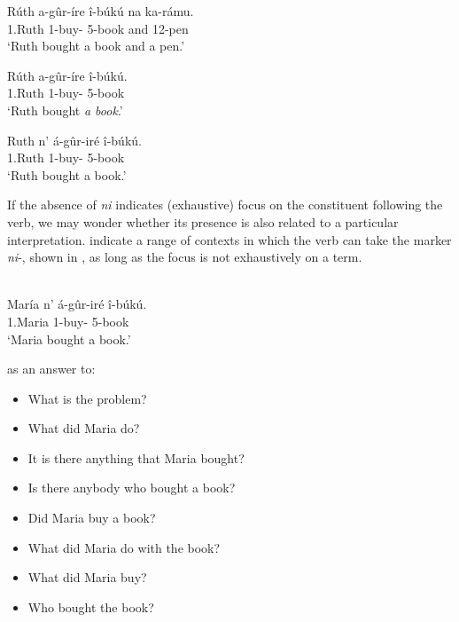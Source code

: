 \documentclass[output=paper]{langscibook}
\begin{document}
\ea
\label{bkm:Ref94536081}\citet[713, tones added]{AbelsMuriungi2008}


\ea
\gll
Rúth  a-gûr-íre  î-búkú  na  ka-rámu.\\
1.Ruth 1\SM{}-buy-\PFV{} 5-book  and  12-pen\\
\glt
‘Ruth bought a book and a pen.’

\ex
\begin{xlist}
\exi{$\not\Rightarrow$}
\label{bkm:Ref94537049}
\gll
Rúth  a-gûr-íre  î-búkú.\\
1.Ruth  1\SM{}-buy-\PFV{} 5-book\\
\glt
‘Ruth bought \textit{a book}.’
\end{xlist}

\ex
\begin{xlist}
\exi{$\Rightarrow$}
\label{bkm:Ref94537037}
\gll
Ruth  n’  á-gûr-iré  î-búkú.\\
1.Ruth \FOC{}  1\SM{}-buy-\PFV{} 5-book\\
\glt
‘Ruth bought a book.’
\end{xlist}

\z
\z



If the absence of \textit{ni} indicates (exhaustive) focus on the constituent following the verb, we may wonder whether its presence is also related to a particular interpretation. \citet[706]{AbelsMuriungi2008} indicate a range of contexts in which the verb can take the marker \textit{ni}-, shown in , as long as the focus is not exhaustively on a term.

\ea
\label{bkm:Ref94538368}
\citep[706, modified]{AbelsMuriungi2008}\\
\gll
María  n’  á-gûr-iré  î-búkú.\\
1.Maria \FOC{}  1\SM{}-buy-\PFV{} 5-book\\
\glt
‘Maria bought a book.’

as an answer to:\largerpage

\begin{itemize}
\settowidth{}
\item What is the problem?
\item What did Maria do?
\item It is there anything that Maria bought?
\item Is there anybody who bought a book?
\item Did Maria buy a book?
\item What did Maria do with the book?
\item What did Maria buy?
\item Who bought the book?
\end{itemize}
\end{document}
